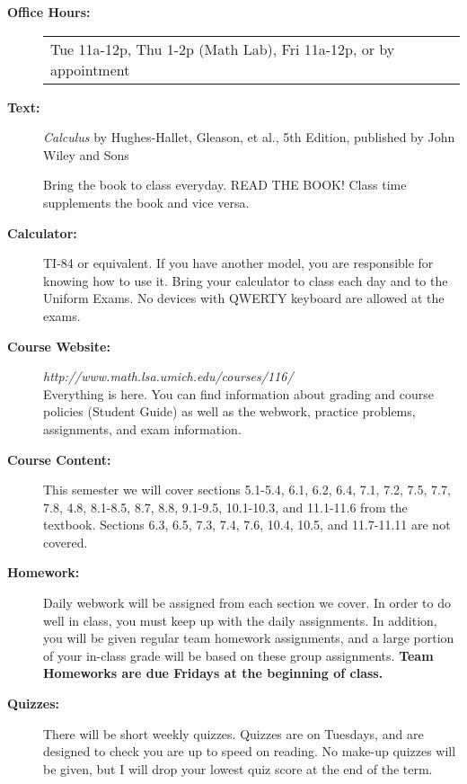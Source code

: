 \documentclass[11pt,twoside]{article}
\begin{document}
\begin{description}
\item[\bf Office Hours:] 
\begin{tabular}{l}
Tue 11a-12p, Thu 1-2p (Math Lab), Fri 11a-12p, or by appointment
\end{tabular}

\vspace{.1in}
\item[\bf Text:] {\it Calculus} by Hughes-Hallet, Gleason, et al.,
5th Edition, published by John Wiley and Sons

Bring the book to class everyday.  READ THE BOOK!  Class time supplements the book and vice versa. 

\vspace{.1in}

\item[\bf Calculator:] TI-84 or equivalent. If you have another
model, you are responsible for knowing how to use it.  Bring your calculator to class each day and to the Uniform Exams.  No devices with QWERTY keyboard are allowed at the exams.

\vspace{.1in}

\item[\bf Course Website:] \emph{http://www.math.lsa.umich.edu/courses/116/}\\
Everything is here.  You can find information about grading and course policies (Student Guide) as well as the webwork, practice problems, assignments, and exam information.  

\vspace{.1in}

\item[\bf Course Content:] This semester we will cover sections 5.1-5.4, 6.1, 6.2, 6.4, 7.1, 7.2, 7.5, 7.7, 7.8, 4.8, 8.1-8.5, 8.7, 8.8, 9.1-9.5, 10.1-10.3, and 11.1-11.6 from the textbook.  Sections 6.3, 6.5, 7.3, 7.4, 7.6, 10.4, 10.5, and 11.7-11.11 are not covered.

\item[\bf Homework:]  Daily webwork will be assigned from each section we cover.  In order to do well in class, you must keep up with the daily assignments.  In addition, you will be given regular team homework assignments, and a large portion of your in-class grade will be based on these group assignments.  {\bf Team Homeworks are due Fridays at the beginning of class.}

\vspace{.1in}
\item[\bf Quizzes:]  There will be short weekly quizzes.  Quizzes are on Tuesdays, and are designed to check you are up to speed on reading.  No make-up quizzes will be given, but I will drop your lowest quiz score at the end of the term.


\end{description}
\end{document}
